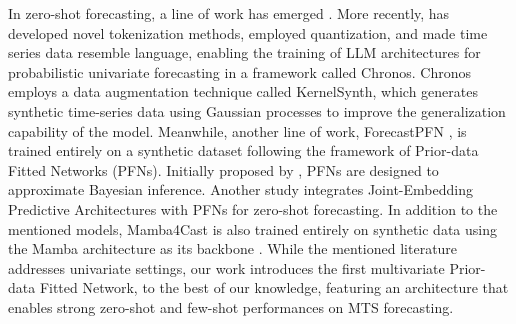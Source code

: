 In zero-shot forecasting, a line of work has emerged \cite{orozco, Oreshkin_Carpov_Chapados_Bengio_2021, domain-adapt, dooley2023forecastpfn, ansari2024chronos}. More recently, \cite{ansari2024chronos} has developed novel tokenization methods, employed quantization, and made time series data resemble language, enabling the training of LLM architectures for probabilistic univariate forecasting in a framework called Chronos. Chronos employs a data augmentation technique called KernelSynth, which generates synthetic time-series data using Gaussian processes to improve the generalization capability of the model. Meanwhile, another line of work, ForecastPFN \cite{dooley2023forecastpfn}, is trained entirely on a synthetic dataset following the framework of Prior-data Fitted Networks (PFNs). Initially proposed by \cite{muller2022transformers}, PFNs are designed to approximate Bayesian inference. Another study \cite{verdenius2024lat} integrates Joint-Embedding Predictive Architectures with PFNs for zero-shot forecasting. In addition to the mentioned models, Mamba4Cast \cite{bhethanabhotla2024mamba4castefficientzeroshottime} is also trained entirely on synthetic data using the Mamba architecture as its backbone \cite{gu2024mambalineartimesequencemodeling}. While the mentioned literature addresses univariate settings, our work introduces the first multivariate Prior-data Fitted Network, to the best of our knowledge, featuring an architecture that enables strong zero-shot and few-shot performances on MTS forecasting. 

